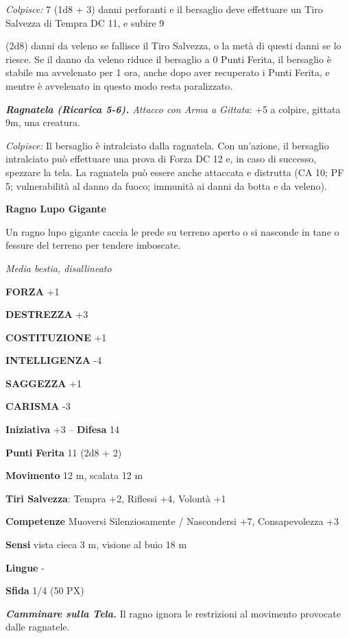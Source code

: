 \begin{multicols}{2}
	\textit{Colpisce:} 7 (1d8 + 3) danni perforanti e il bersaglio deve effettuare un Tiro Salvezza di Tempra DC 11, e subire 9

	(2d8) danni da veleno se fallisce il Tiro Salvezza, o la metà di questi danni se lo riesce. Se il danno da veleno riduce il bersaglio a 0 Punti Ferita, il bersaglio è stabile ma avvelenato per 1 ora, anche dopo aver recuperato i Punti Ferita, e mentre è avvelenato in questo modo resta paralizzato.

	\textit{\textbf{Ragnatela (Ricarica 5-6).} Attacco con Arma a Gittata}: +5 a colpire, gittata 9m, una creatura.

	\textit{Colpisce:} Il bersaglio è intralciato dalla ragnatela. Con un'azione, il bersaglio intralciato può effettuare una prova di Forza DC 12 e, in caso di successo, spezzare la tela. La ragnatela può essere anche attaccata e distrutta (CA 10; PF 5; vulnerabilità al danno da fuoco; immunità ai danni da botta e da veleno).

	\medskip\textbf{Ragno Lupo Gigante}

	Un ragno lupo gigante caccia le prede su terreno aperto o si nasconde in tane o fessure del terreno per tendere imboscate.

	\textit{Media bestia, disallineato}

	\textbf{FORZA} +1

	\textbf{DESTREZZA} +3

	\textbf{COSTITUZIONE} +1

	\textbf{INTELLIGENZA} -4

	\textbf{SAGGEZZA} +1

	\textbf{CARISMA} -3

	\textbf{Iniziativa} +3 -- \textbf{Difesa} 14

	\textbf{Punti Ferita} 11 (2d8 + 2)

	\textbf{Movimento} 12 m, scalata 12 m

	\textbf{Tiri Salvezza}: Tempra +2, Riflessi +4, Volontà +1

	\textbf{Competenze} Muoversi Silenziosamente / Nascondersi +7, Consapevolezza +3

	\textbf{Sensi} vista cieca 3 m, visione al buio 18 m

	\textbf{Lingue} -

	\textbf{Sfida} 1/4 (50 PX)

	\textit{\textbf{Camminare sulla Tela.}} Il ragno ignora le restrizioni al movimento provocate dalle ragnatele.


\end{multicols}
